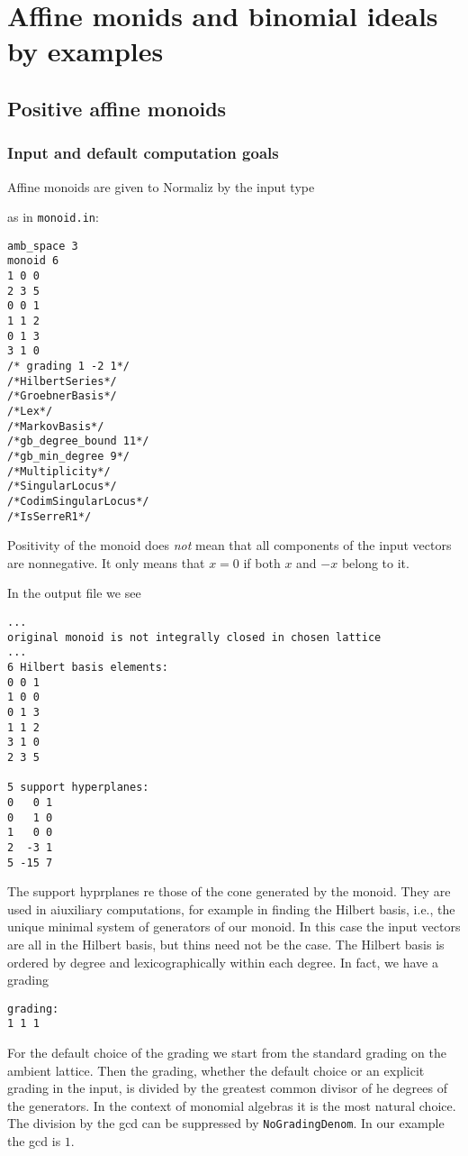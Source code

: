 \section{Affine monids and binomial ideals by examples}\label{AffMon}

\subsection{Positive affine monoids}\label{monoid}

\subsubsection{Input and default computation goals}
Affine monoids are given to Normaliz by the input type 
\begin{itemize}
	\itemtt[monoid]
\end{itemize}
as in \verb|monoid.in|:
\begin{Verbatim}
amb_space 3
monoid 6
1 0 0
2 3 5
0 0 1
1 1 2
0 1 3
3 1 0
/* grading 1 -2 1*/
/*HilbertSeries*/
/*GroebnerBasis*/
/*Lex*/
/*MarkovBasis*/
/*gb_degree_bound 11*/
/*gb_min_degree 9*/
/*Multiplicity*/
/*SingularLocus*/
/*CodimSingularLocus*/
/*IsSerreR1*/
\end{Verbatim}
Positivity of the monoid does \emph{not} mean that all components of the input vectors are nonnegative. It only means that $x=0$ if both $x$ and $-x$ belong to it.

In the output file we see
\begin{Verbatim}
...
original monoid is not integrally closed in chosen lattice
...
6 Hilbert basis elements:
0 0 1
1 0 0
0 1 3
1 1 2
3 1 0
2 3 5

5 support hyperplanes:
0   0 1
0   1 0
1   0 0
2  -3 1
5 -15 7
\end{Verbatim}
The support hyprplanes re those of the cone generated by the monoid. They are used in aiuxiliary computations, for example in finding the Hilbert basis, i.e., the unique minimal system of generators of our monoid. In this case the input vectors are all in the Hilbert basis, but thins need not be the case. The Hilbert basis is ordered by degree and lexicographically within each degree. In fact, we have a grading
\begin{Verbatim}
grading:
1 1 1 
\end{Verbatim}
For the default choice of the grading we start from the standard grading on the ambient lattice. Then the grading, whether the default choice or an explicit grading in the input, is divided by the greatest common divisor of he degrees of the generators. In the context of monomial algebras it is the most natural choice. The division by the gcd can be suppressed by \verb|NoGradingDenom|. In our example the gcd is $1$.


